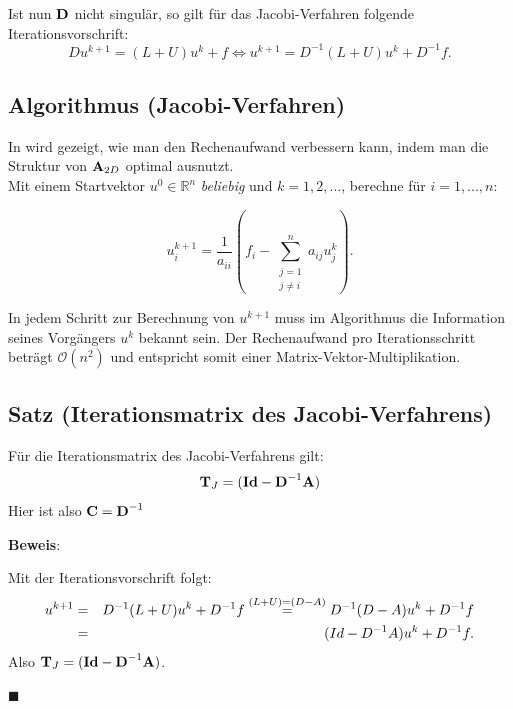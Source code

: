 Ist nun ${\textbf{D}}$ nicht singulär, so gilt für das Jacobi-Verfahren folgende Iterationsvorschrift:
\begin{equation}
Du^{k+1} = (L+U)u^{k} + f \Leftrightarrow u^{k+1} = D^{-1}(L+U)u^{k} + D^{-1}f.
\end{equation}

\subsection{Algorithmus (Jacobi-Verfahren)}\label{ss.Allgemeines Jacobi-Verfahren}

In \cite{ALO2} wird gezeigt, wie man den Rechenaufwand verbessern kann, indem man die Struktur von ${\textbf{A}}_{2D}$ optimal ausnutzt.\\
Mit einem Startvektor $u^{0} \in \mathbb{R}^{n}$ \textit{beliebig} und $k=1,2,...$, berechne für $i=1,...,n$:

\begin{equation}
u^{k+1}_{i} = \frac {1} {a_{ii}} (f_{i} - \sum_{\substack{j = 1 \\ j \ne i}}^{n} a_{ij}u^{k}_{j}).
\end{equation}

In jedem Schritt zur Berechnung von $u^{k+1}$ muss im Algorithmus die Information seines Vorgängers $u^{k}$ bekannt sein. Der Rechenaufwand pro Iterationsschritt beträgt $\mathcal{O}(n^{2})$ und entspricht somit einer Matrix-Vektor-Multiplikation.

\subsection{Satz (Iterationsmatrix des Jacobi-Verfahrens)}\label{ss.Iterationsmatrix Jacobi}

Für die Iterationsmatrix des Jacobi-Verfahrens gilt:
\begin{equation}
{\textbf{T}}_{J} = ({\textbf{Id}} - {\textbf{D}}^{-1} {\textbf{A}})
\end{equation}
Hier ist also ${\textbf{C}} = {\textbf{D}}^{-1}$

\textbf{Beweis}:

Mit der Iterationsvorschrift folgt:
\begin{eqnarray}
u^{k+1} &=& D^{-1}(L+U)u^{k} + D^{-1}f \overset{(L+U)=(D-A)}{=} D^{-1}(D-A)u^{k}+D^{-1}f \notag \\
&=& (Id-D^{-1}A)u^{k} + D^{-1}f. \notag
\end{eqnarray}
Also ${\textbf{T}}_{J} = ({\textbf{Id}} - {\textbf{D}}^{-1} {\textbf{A}})$.
\begin{flushright}
$\blacksquare$
\end{flushright}

